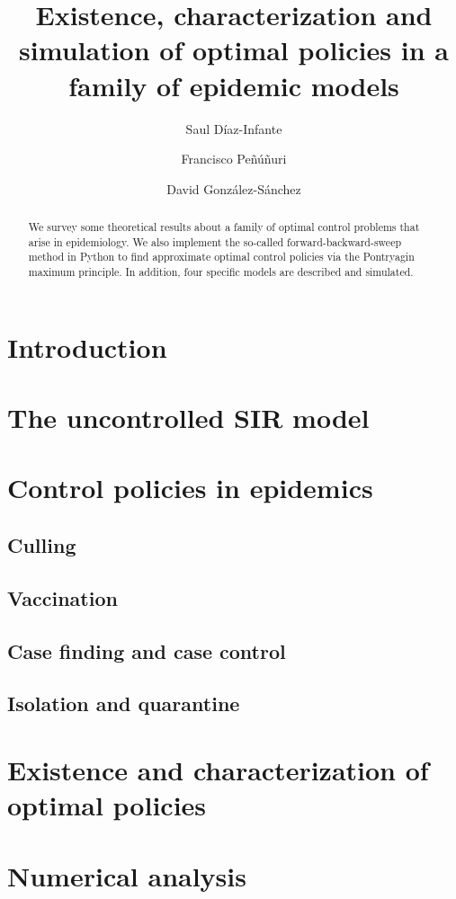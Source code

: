 \documentclass[11pt]{amsart}
\title[%
	Optimal policies in a family of epidemic models%
	]{
	Existence, characterization and simulation of optimal policies in a family of epidemic 
  models
}
\author[S. D\'iaz-Infante]{Saul D\'iaz-Infante}
\author[F. Pe\~nu\~n\'{u}ri]{Francisco Pe\~n\'u\~nuri}
\author[D. Gonz\'alez-S\'anchez]{David Gonz\'alez-S\'anchez}
\theoremstyle{definition}
\numberwithin{equation}{section}
\begin{document}
  \begin{abstract}
    We survey some theoretical results about a family of optimal 
    control problems that arise in epidemiology. We also implement the
    so-called forward-backward-sweep method in Python to find approximate
    optimal control policies via the Pontryagin maximum principle. 
    In addition, four specific models are described and simulated.
  \end{abstract}
\maketitle
%
  \section{Introduction}
    
  \section{The uncontrolled SIR model}
    
  \section{Control policies in epidemics}
    
    \subsection{Culling}
      
    \subsection{Vaccination}
      
    \subsection{Case finding and case control}
      
    \subsection{Isolation and quarantine}
      
%
  \section{Existence and characterization of optimal policies}
    
%
  \section{Numerical analysis}
    
    
\end{document}
